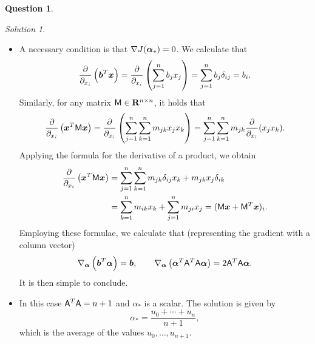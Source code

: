 \documentclass[11pt]{article}
\theoremstyle{definition}
\newtheorem{question}{Question}
\theoremstyle{remark}
\newtheorem*{protosolution}{Solution}
\newenvironment{solutionframe}
{%
    \begin{mdframed}[
        leftmargin=1cm,
        skipabove=.3cm,
        linecolor=blue,
        backgroundcolor=lightgreen,
        linewidth=0pt,
        innerleftmargin=.5em,
        innerrightmargin=.5em,
        innertopmargin=.3em,
        innerbottommargin=.6em,
    ]
}
{
    \end{mdframed}
}
\newenvironment{solution}
{\pushQED{\qed}\renewcommand{\qedsymbol}{$\triangle$}
\begin{solutionframe}\small \begin{protosolution}}
{\popQED\end{protosolution}\end{solutionframe}}
\begin{document}
\begin{question}
\begin{enumerate}
\begin{solution}
\begin{itemize}
                \item
                A necessary condition is that $\nabla J(\mathbf{\boldsymbol{\alpha}}_*) = 0$.
                We calculate that
                \[
                    \frac{\partial}{\partial_{x_i}} \left(\mathbf{\boldsymbol{b}}^T \mathbf{\boldsymbol{x}}\right)
                    = \frac{\partial}{\partial_{x_i}} \left(\sum_{j=1}^{n} b_j x_j\right) = \sum_{j=1}^{n} b_j \delta_{ij} = b_i.
                \]
                Similarly, for any matrix $\mathsf M \in \mathbf R^{n \times n}$,
                it holds that
                \[
                    \frac{\partial}{\partial_{x_i}} \left(\mathbf{\boldsymbol{x}}^T \mathsf M \mathbf{\boldsymbol{x}} \right)
                    = \frac{\partial}{\partial_{x_i}} \left(\sum_{j=1}^{n}\sum_{k=1}^{n} m_{jk} x_j x_k\right)
                    =  \sum_{j=1}^{n}\sum_{k=1}^{n} m_{jk} \frac{\partial}{\partial_{x_i}} (x_j x_k).
                \]
                Applying the formula for the derivative of a product,
                we obtain
                \begin{align*}
                    \frac{\partial}{\partial_{x_i}} \left(\mathbf{\boldsymbol{x}}^T \mathsf M \mathbf{\boldsymbol{x}} \right)
                    &= \sum_{j=1}^{n}\sum_{k=1}^{n} m_{jk} \delta_{ij} x_k + m_{jk} x_j \delta_{ik} \\
                    &= \sum_{k=1}^{n} m_{ik} x_k + \sum_{j=1}^{n} m_{ji} x_j
                    = (\mathsf M \mathbf{\boldsymbol{x}} + \mathsf M^T \mathbf{\boldsymbol{x}})_i.
                \end{align*}
                Employing these formulae,
                we calculate that (representing the gradient with a column vector)
                \[
                    \nabla_{\mathbf{\boldsymbol{\alpha}}} \left(\mathbf{\boldsymbol{b}}^T \mathbf{\boldsymbol{\alpha}}\right)
                    = \mathbf{\boldsymbol{b}}, \qquad \nabla_{\mathbf{\boldsymbol{\alpha}}} \left(\mathbf{\boldsymbol{\alpha}}^T \mathsf A^T \mathsf A \mathbf{\boldsymbol{\alpha}}\right)
                    = 2 \mathsf A^T \mathsf A \mathbf{\boldsymbol{\alpha}}.
                \]
                It is then simple to conclude.

                \item
                    In this case $\mathsf A^T \mathsf A = n+1$ and $\alpha_*$ is a scalar.
                    The solution is given by
                    \[
                        \alpha_* = \frac{u_0 + \dotsb + u_n}{n+1},
                    \]
                    which is the average of the values $u_0, \dotsc, u_{n+1}$.
            \end{itemize}
        \end{solution}
\end{enumerate}
\end{question}
\end{document}
